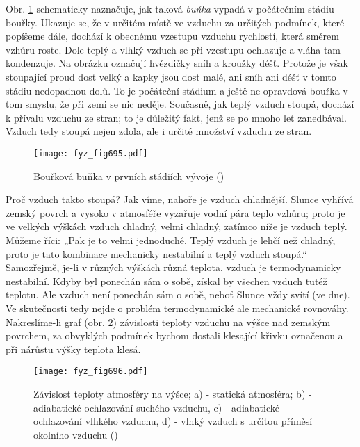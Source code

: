     Obr. \ref{fyz:fig695} schematicky naznačuje, jak taková \emph{buňka} vypadá v počátečním
    stádiu bouřky. Ukazuje se, že v určitém místě ve vzduchu za určitých podmínek, které popíšeme
    dále, dochází k obecnému vzestupu vzduchu rychlostí, která směrem vzhůru roste. Dole teplý a
    vlhký vzduch se při vzestupu ochlazuje a vláha tam kondenzuje. Na obrázku označují hvězdičky
    sníh a kroužky déšť. Protože je však stoupající proud dost velký a kapky jsou dost malé, ani
    sníh ani déšť v tomto stádiu nedopadnou dolů. To je počáteční stádium a ještě ne opravdová
    bouřka v tom smyslu, že při zemi se nic neděje. Současně, jak teplý vzduch stoupá, dochází k
    přívalu vzduchu ze stran; to je důležitý fakt, jenž se po mnoho let zanedbával. Vzduch tedy
    stoupá nejen zdola, ale i určité množství vzduchu ze stran.    

    \begin{figure}[ht!] %
      \centering
      \texttt{[image: fyz\_fig695.pdf]}
      \caption{Bouřková buňka v prvních stádiích vývoje (\cite[s.~707]{Feynman02})}
      \label{fyz:fig695}
    \end{figure}

    Proč vzduch takto stoupá? Jak víme, nahoře je vzduch chladnější. Slunce vyhřívá zemský povrch
    a vysoko v atmosféře vyzařuje vodní pára teplo vzhůru; proto je ve velkých výškách vzduch
    chladný, velmi chladný, zatímco níže je vzduch teplý. Můžeme říci: „Pak je to velmi
    jednoduché. Teplý vzduch je lehčí než chladný, proto je tato kombinace mechanicky nestabilní a
    teplý vzduch stoupá.“ Samozřejmě, je-li v různých výškách různá teplota, vzduch je
    termodynamicky nestabilní. Kdyby byl ponechán sám o sobě, získal by všechen vzduch tutéž
    teplotu. Ale vzduch není ponechán sám o sobě, neboť Slunce vždy svítí (ve dne). Ve skutečnosti
    tedy nejde o problém termodynamické ale mechanické rovnováhy. Nakreslíme-li graf (obr.
    \ref{fyz:fig696}) závislosti teploty vzduchu na výšce nad zemským povrchem, za obvyklých
    podmínek bychom dostali klesající křivku označenou a při nárůstu výšky teplota klesá.

    \begin{figure}[ht!] %
      \centering
      \texttt{[image: fyz\_fig696.pdf]}
      \caption{Závislost teploty atmosféry na výšce; a) - statická atmosféra; b) - adiabatické
              ochlazování suchého vzduchu, c) - adiabatické ochlazování vlhkého vzduchu, d) -
              vlhký vzduch s určitou příměsí okolního vzduchu (\cite[s.~707]{Feynman02})}
      \label{fyz:fig696}
    \end{figure}

